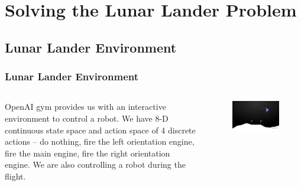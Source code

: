 \documentclass{beamer}
\begin{document}
\section{Solving the Lunar Lander Problem}

\subsection{Lunar Lander Environment}

\begin{frame}
\frametitle{Lunar Lander Environment}
\begin{columns}[c] %
	
	OpenAI gym provides us with an interactive environment
	to control a robot. We have 8-D continuous 
	state space and action space of 4 discrete actions -- 
	do nothing, fire the left orientation engine, fire the main
	engine, fire the right orientation engine. 
	We are also controlling a robot during the flight. 
	
	\begin{figure}
	\includegraphics[scale=0.5]{lunar}
	\end{figure}
		
\end{columns}
\end{frame}
\end{document}
